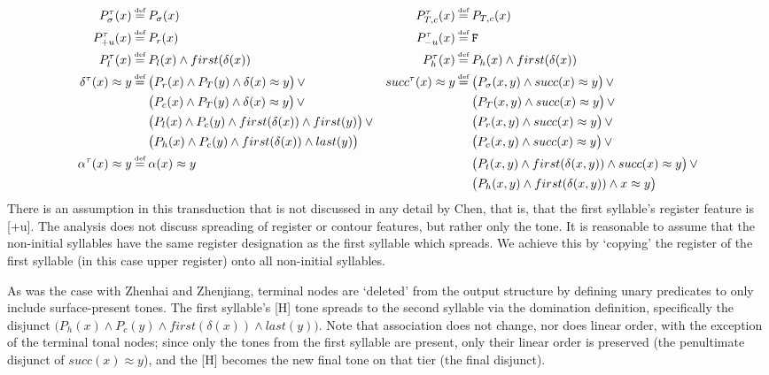 \documentclass{article}
\newcommand\myeq{\mathrel{\stackrel{\makebox[0pt]{\mbox{\normalfont\tiny def}}}{=}}}
\newcommand{\ap}{\approx}
\begin{document}
\begin{equation}
\begin{aligned}
P^{\tau}_{\sigma}(x)&\myeq P_{\sigma}(x) & P^{\tau}_{T,c}(x)&\myeq P_{T,c}(x) \\
P^{\tau}_{+u}(x)&\myeq P_{r}(x) & P^{\tau}_{-u}(x)&\myeq\mathtt{F} \\
P^{\tau}_{l}(x)&\myeq P_{l}(x)\land first(\delta(x)) & P^{\tau}_{h}(x)&\myeq P_{h}(x)\land first(\delta(x)) \\
\delta^{\tau}(x)\ap y &\myeq \big(P_{r}(x)\land P_{T}(y)\land \delta(x)\ap y\big)\,\lor & succ^{\tau}(x)\ap y &\myeq \big(P_{\sigma}(x,y)\land succ(x)\ap y\big)\,\lor \\
&\quad\,\,\big(P_{c}(x)\land P_{T}(y)\land \delta(x)\ap y\big)\,\lor & &\quad\,\,\big(P_{T}(x,y) \land succ(x)\ap y\big)\,\lor \\
&\quad\,\,\big(P_{l}(x)\land P_{c} (y) \land first(\delta(x)) \land first(y)\big)\,\lor & &\quad\,\,\big(P_{r}(x,y) \land succ(x)\ap y\big)\,\lor \\ 
&\quad\,\,\big(P_{h}(x)\land P_{c} (y)\land first(\delta(x)) \land last (y) \big) & &\quad\,\,\big(P_{c}(x,y) \land succ(x)\ap y\big)\,\lor \\
\alpha^{\tau}(x)\ap y&\myeq \alpha(x) \ap y & &\quad\,\,\big(P_{t}(x,y)\land first(\delta(x,y))\land succ(x)\ap y\big)\,\lor \\
& & &\quad\,\,\big(P_{h}(x,y)\land first(\delta(x,y))\land x\ap y\big) \\
\end{aligned}
\end{equation}
There is an assumption in this transduction that is not discussed in any detail by Chen, that is, that the first syllable's register feature is [+u]. The analysis does not discuss spreading of register or contour features, but rather only the tone. It is reasonable to assume that the non-initial syllables have the same register designation as the first syllable which spreads. We achieve this by `copying' the register of the first syllable (in this case upper register) onto all non-initial syllables. \par
As was the case with Zhenhai and Zhenjiang, terminal nodes are `deleted' from the output structure by defining unary predicates to only include surface-present tones. The first syllable's [H] tone spreads to the second syllable via the domination definition, specifically the disjunct $\big(P_{h}(x)\land P_{c} (y)\land first(\delta(x)) \land last (y) \big)$. Note that association does not change, nor does linear order, with the exception of the terminal tonal nodes; since only the tones from the first syllable are present, only their linear order is preserved (the penultimate disjunct of $succ(x)\ap y$), and the [H] becomes the new final tone on that tier (the final disjunct). \par
\end{document}
